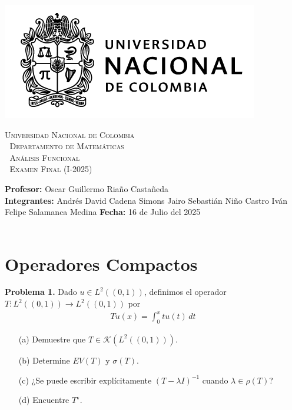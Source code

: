 \thispagestyle{empty}

\begin{minipage}{0.3\textwidth}
  \includegraphics[scale=0.35]{logounal.png}
\end{minipage}%
\hfill
\begin{minipage}{0.65\textwidth}
  \begin{center}
    \scshape
    \Large \textsc{Universidad Nacional de Colombia} \\
    \textcolor{white}{\tiny.} \Large \textsc{Departamento de Matemáticas} \\
    \textcolor{white}{\tiny.} \large \textsc{Análisis Funcional} \\
    \textcolor{white}{\tiny.} \large \textsf{Examen Final} \normalsize (I-2025)
  \end{center}
\end{minipage}

\vspace{0.3cm}
\normalfont

\textbf{Profesor:} Oscar Guillermo Riaño Castañeda\\
\textbf{Integrantes:} Andrés David Cadena Simons \hspace{2.8cm}  Jairo Sebastián Niño Castro\hspace{2.8cm}
Iván Felipe Salamanca Medina \hspace{5.05cm}\textbf{Fecha:} 16 de Julio del 2025\\
\vspace{0.25cm}\\


\section{Operadores Compactos}

\textbf{Problema 1.} Dado $u \in L^2((0,1))$, definimos el operador $T:L^2((0,1))\to L^2((0,1))$ por
\begin{align*}
    Tu(x)=\int_0^x tu(t)\, dt
\end{align*}
\begin{enumerate}
        \item[(a)] Demuestre que $T\in \mathcal{K}(L^2((0,1)))$.
        \item[(b)] Determine $EV(T)$ y $\sigma(T)$.
        \item[(c)] ¿Se puede escribir explícitamente $(T-\lambda I)^{-1}$ cuando $\lambda\in \rho(T)$?
        \item[(d)] Encuentre $T^\star$.
\end{enumerate}


